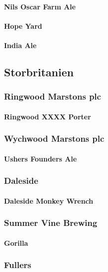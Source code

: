 \documentclass[11pt]{article}
\begin{document}
\paragraph{Nils Oscar Farm Ale}
\label{sec:orge9c2052}
\paragraph{Hope Yard}
\label{sec:org290c040}
\paragraph{India Ale}
\label{sec:orgafa679a}
\subsection{Storbritanien}
\label{sec:orga53533f}
\subsubsection{Ringwood Marstons plc}
\label{sec:orgad3d775}
\paragraph{Ringwood XXXX Porter}
\label{sec:org8b85200}
\subsubsection{Wychwood Marstons plc}
\label{sec:org762e880}
\paragraph{Ushers Founders Ale}
\label{sec:org5d66e77}
\subsubsection{Daleside}
\label{sec:org21175f4}
\paragraph{Daleside Monkey Wrench}
\label{sec:org4791f04}
\subsubsection{Summer Vine Brewing}
\label{sec:org1125474}
\paragraph{Gorilla}
\label{sec:org353b89a}
\subsubsection{Fullers}
\label{sec:org2455add}
\end{document}

